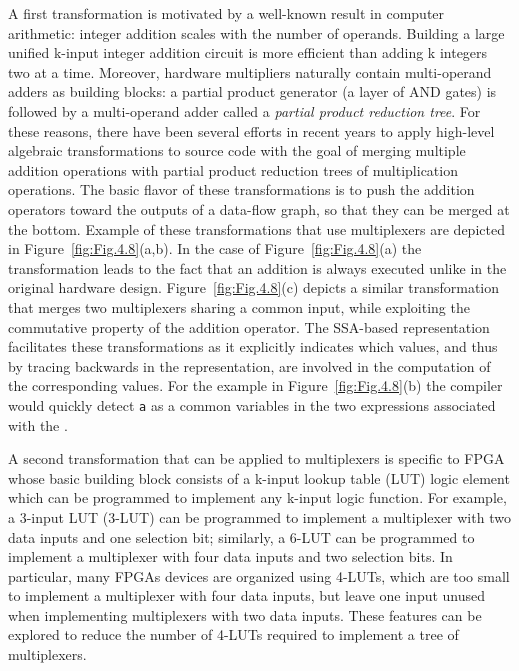 A first transformation is motivated by a well-known result in computer arithmetic: 
integer addition scales with the number of operands. 
Building a large unified k-input integer addition circuit is more efficient than adding k integers two at a time. 
Moreover, hardware multipliers naturally contain multi-operand adders as building blocks: 
a partial product generator (a layer of AND gates) is followed by a multi-operand adder called a {\em partial product reduction tree}. 
For these reasons, there have been several efforts in recent years to apply high-level algebraic transformations to source code with the goal of merging multiple addition operations with partial product reduction trees of multiplication operations. 
The basic flavor of these transformations is to push the addition operators toward the outputs of a data-flow graph, so that they can be merged at the bottom. 
Example of these transformations that use multiplexers are depicted in Figure~\ref{fig:Fig.4.8}(a,b). 
In the case of Figure~\ref{fig:Fig.4.8}(a) the transformation leads to the fact that an addition is always executed unlike in the original hardware design. 
Figure~\ref{fig:Fig.4.8}(c) depicts a similar transformation that merges two multiplexers sharing a common input, while exploiting the commutative property of the addition operator. 
The SSA-based representation facilitates these transformations as it explicitly indicates which values, and thus by tracing backwards in the representation, are involved in the computation of the corresponding values. 
For the example in Figure~\ref{fig:Fig.4.8}(b) the compiler would quickly detect {\tt a} as a common variables in the two expressions associated with the \phifun.

A second transformation that can be applied to multiplexers is specific to FPGA whose basic building block consists of a k-input lookup table (LUT) logic element which can be programmed to implement any k-input logic function. 
For example, a 3-input LUT (3-LUT) can be programmed to implement a multiplexer with two data inputs and one selection bit; 
similarly, a 6-LUT can be programmed to implement a multiplexer with four data inputs and two selection bits. 
In particular, many FPGAs devices are organized using 4-LUTs, which are too small to implement a multiplexer with four data inputs, but leave one input unused when implementing multiplexers with two data inputs. 
These features can be explored to reduce the number of 4-LUTs required to implement a tree of multiplexers.\\

